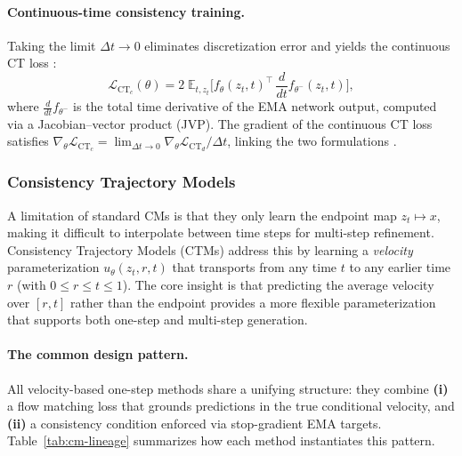 \paragraph{Continuous-time consistency training.} Taking the limit $\Delta t \to 0$ eliminates discretization error and yields the continuous CT loss \citep{song2023consistency, lu2025ct}:
\begin{equation}
    \mathcal{L}_{\text{CT}_c}(\theta) = 2 \; \mathbb{E}_{t, z_t} \Big[ f_\theta(z_t, t)^{\top} \, \frac{d}{dt} f_{\theta^-}(z_t, t) \Big],
    \label{eq:ct-continuous}
\end{equation}
where $\frac{d}{dt} f_{\theta^-}$ is the total time derivative of the EMA network output, computed via a Jacobian--vector product (JVP). The gradient of the continuous CT loss satisfies $\nabla_\theta \mathcal{L}_{\text{CT}_c} = \lim_{\Delta t \to 0} \nabla_\theta \mathcal{L}_{\text{CT}_d} / \Delta t$, linking the two formulations \citep{song2023consistency}.

\subsubsection{Consistency Trajectory Models}
\label{subsec:ctm}

A limitation of standard CMs is that they only learn the endpoint map $z_t \mapsto x$, making it difficult to interpolate between time steps for multi-step refinement. Consistency Trajectory Models (CTMs) \citep{kim2024ctm} address this by learning a \emph{velocity} parameterization $u_\theta(z_t, r, t)$ that transports from any time $t$ to any earlier time $r$ (with $0 \le r \le t \le 1$). The core insight is that predicting the average velocity over $[r, t]$ rather than the endpoint provides a more flexible parameterization that supports both one-step and multi-step generation.

\paragraph{The common design pattern.} All velocity-based one-step methods share a unifying structure: they combine \textbf{(i)} a flow matching loss that grounds predictions in the true conditional velocity, and \textbf{(ii)} a consistency condition enforced via stop-gradient EMA targets. Table~\ref{tab:cm-lineage} summarizes how each method instantiates this pattern.

